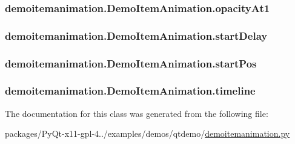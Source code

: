 \subsubsection[{opacity\+At1}]{\setlength{\rightskip}{0pt plus 5cm}demoitemanimation.\+Demo\+Item\+Animation.\+opacity\+At1}\label{classdemoitemanimation_1_1DemoItemAnimation_a49e68b56ba9482d09e9e60a01170768d}
\hypertarget{classdemoitemanimation_1_1DemoItemAnimation_a20a3c2c79bf3b4ffd692b217e96a902d}{}
\subsubsection[{start\+Delay}]{\setlength{\rightskip}{0pt plus 5cm}demoitemanimation.\+Demo\+Item\+Animation.\+start\+Delay}\label{classdemoitemanimation_1_1DemoItemAnimation_a20a3c2c79bf3b4ffd692b217e96a902d}
\hypertarget{classdemoitemanimation_1_1DemoItemAnimation_a4f51c7f2667e4724fa2dc7c4861d4597}{}
\subsubsection[{start\+Pos}]{\setlength{\rightskip}{0pt plus 5cm}demoitemanimation.\+Demo\+Item\+Animation.\+start\+Pos}\label{classdemoitemanimation_1_1DemoItemAnimation_a4f51c7f2667e4724fa2dc7c4861d4597}
\hypertarget{classdemoitemanimation_1_1DemoItemAnimation_a37ae688669db96f6bae041df7b17101d}{}
\subsubsection[{timeline}]{\setlength{\rightskip}{0pt plus 5cm}demoitemanimation.\+Demo\+Item\+Animation.\+timeline}\label{classdemoitemanimation_1_1DemoItemAnimation_a37ae688669db96f6bae041df7b17101d}


The documentation for this class was generated from the following file\+:\begin{DoxyCompactItemize}
\item 
packages/\+Py\+Qt-\/x11-\/gpl-\/4../examples/demos/qtdemo/\hyperlink{demoitemanimation_8py}{demoitemanimation.\+py}\end{DoxyCompactItemize}
